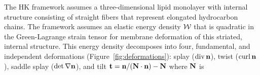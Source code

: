 
The HK framework assumes a three-dimensional lipid monolayer with internal structure
consisting of straight fibers that represent elongated hydrocarbon chains.
The framework assumes an elastic energy density ${\cal W}$ that is quadratic in the
Green-Lagrange strain tensor for membrane deformation of
this striated, internal structure.
%
%
%
%
%
This energy density decomposes into four, fundamental, and independent
deformations (Figure~\ref{fig:deformations}): splay ($\operatorname{div} {\bf n}$),
twist ($\operatorname{curl} {\bf n}$), saddle splay ($\det \nabla {\bf n}$), and tilt
${\bf t}={\bf n}/({\bf N}\cdot {\bf n}) - {\bf N}$ where ${\bf N}$ is
